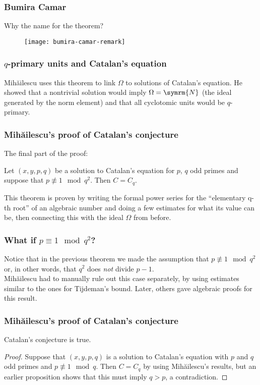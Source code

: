 \begin{frame}
\frametitle{Bumira Camar}

Why the name for the theorem?

\begin{figure}
    \centering
    \texttt{[image: bumira-camar-remark]}
\end{figure}
\end{frame}

\begin{frame}
\frametitle{\(q\)-primary units and Catalan's equation}

Mihăilescu uses this theorem to link \(\Omega\) to solutions of Catalan's equation. He showed that a nontrivial solution would imply \(\Omega = \symrm{N}\) (the ideal generated by the norm element) and that all cyclotomic units would be \(q\)-primary.
\end{frame}

\begin{frame}
\frametitle{Mihăilescu's proof of Catalan's conjecture}

The final part of the proof:
\begin{theorem}
Let \(\left(x, y, p, q\right)\) be a solution to Catalan's equation for \(p\), \(q\) odd primes and suppose that \(p \not\equiv 1 \mod{q^2}\). Then \(C = C_q\).
\end{theorem}

\vspace{1em}

This theorem is proven by writing the formal power series for the ``elementary q-th root'' of an algebraic number and doing a few estimates for what its value can be, then connecting this with the ideal \(\Omega\) from before.
\end{frame}

\begin{frame}
\frametitle{What if \(p \equiv 1 \mod{q^2}\)?}

Notice that in the previous theorem we made the assumption that \(p \not\equiv 1 \mod{q^2}\) or, in other words, that \(q^2\) does \emph{not} divide \(p - 1\). \\[1em]

Mihăilescu had to manually rule out this case separately, by using estimates similar to the ones for Tijdeman's bound. Later, others gave algebraic proofs for this result.
\end{frame}

\begin{frame}
\frametitle{Mihăilescu's proof of Catalan's conjecture}

\begin{theorem}
Catalan's conjecture is true.
\end{theorem}
\begin{proof}
Suppose that \((x, y, p, q)\) is a solution to Catalan's equation with \(p\) and \(q\) odd primes and \(p \not\equiv 1 \mod{q}\). Then \(C = C_q\) by using Mihăilescu's results, but an earlier proposition shows that this must imply \(q > p\), a contradiction.
\end{proof}

\end{frame}
